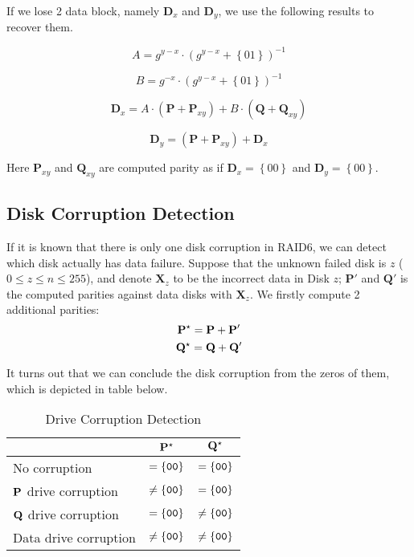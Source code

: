 If we lose 2 data block, namely $\mathbf{D}_x$ and $\mathbf{D}_y$, we use the following results to recover them.

\begin{equation}
	A = g^{y-x}\cdot (g^{y-x}+\left\{01\right\})^{-1}
\end{equation}

\begin{equation}
	B = g^{-x}\cdot(g^{y-x}+\left\{01\right\})^{-1}
\end{equation}

\begin{equation}
	\mathbf{D}_{x} = A\cdot (\mathbf{P}+\mathbf{P}_{xy}) + B\cdot (\mathbf{Q}+\mathbf{Q}_{xy})
\end{equation}

\begin{equation}
	\mathbf{D}_{y} = (\mathbf{P}+\mathbf{P}_{xy}) + \mathbf{D}_x
\end{equation}

Here $\mathbf{P}_{xy}$ and $\mathbf{Q}_{xy}$ are computed parity as if $\mathbf{D}_x=\left\{00\right\}$ and $\mathbf{D}_y=\left\{00\right\}$.


\subsection{Disk Corruption Detection}

If it is known that there is only one disk corruption in RAID6, we can detect which disk actually has data failure. Suppose that the unknown failed disk is $z$ ($0\leq z\leq n\leq 255$), and denote $\mathbf{X}_z$ to be the incorrect data in Disk $z$; $\mathbf{P}'$ and $\mathbf{Q}'$ is the computed parities against data disks with $\mathbf{X}_z$. We firstly compute 2 additional parities:
\begin{equation}
	\Pstar = \mathbf{P} + \mathbf{P}'
\end{equation}
\begin{equation}
	\Qstar = \mathbf{Q} + \mathbf{Q}'
\end{equation}

It turns out that we can conclude the disk corruption from the zeros of them, which is depicted in table below.

\begin{table}[H]
  \caption{Drive Corruption Detection}
\begin{center}
\def\tmp#1{\multicolumn{1}{|l|}{#1}}
\begin{tabular}{l|c|c|} \cline{2-3}
& $\Pstar$ & $\Qstar$ \\ \hline
\tmp{No corruption} & $= \g{00}$ & $= \g{00}$ \\ \hline
\tmp{$\P$ drive corruption} & $\not= \g{00}$ & $= \g{00}$ \\ \hline
\tmp{$\Q$ drive corruption} & $= \g{00}$ & $\not= \g{00}$ \\ \hline
\tmp{Data drive corruption} & $\not= \g{00}$ & $\not= \g{00}$ \\ \hline
\end{tabular}
\end{center}
\end{table}

